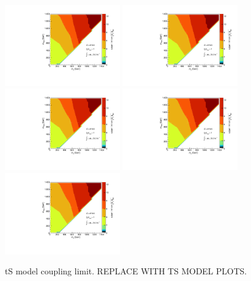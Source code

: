 \begin{figure}
\begin{center}
\includegraphics[width=0.45\textwidth]{figures/coupling_limits_TSD_1.pdf}
\includegraphics[width=0.45\textwidth]{figures/coupling_limits_TSD_1.pdf}
\includegraphics[width=0.45\textwidth]{figures/coupling_limits_TSD_1.pdf}
\includegraphics[width=0.45\textwidth]{figures/coupling_limits_TSD_1.pdf}
\includegraphics[width=0.45\textwidth]{figures/coupling_limits_TSD_1.pdf}
\caption{tS model coupling limit. REPLACE WITH TS MODEL PLOTS.}
\label{fig:MonoZ_TSD_couplinglimit}
\end{center}
\end{figure}

